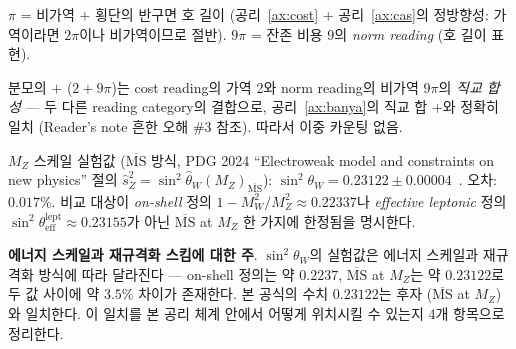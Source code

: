 \documentclass[entropy,article,submit,pdftex,oneauthor]{Definitions/mdpi}
\begin{document}
\textbf{$\pi$} = 비가역 $+$ 횡단의 반구면 호 길이 (공리~\ref{ax:cost} + 공리~\ref{ax:cas}의 정방향성: 가역이라면 $2\pi$이나 비가역이므로 절반). $9\pi$ = 잔존 비용 9의 \emph{norm reading} (호 길이 표현).

분모의 $+$ ($2 + 9\pi$)는 cost reading의 가역 2와 norm reading의 비가역 $9\pi$의 \emph{직교 합성} — 두 다른 reading category의 결합으로, 공리~\ref{ax:banya}의 직교 합 $+$와 정확히 일치 (Reader's note 흔한 오해 \#3 참조). 따라서 이중 카운팅 없음.

$M_Z$ 스케일 실험값 ($\overline{\mathrm{MS}}$ 방식, PDG 2024 ``Electroweak model and constraints on new physics'' 절의 $\hat s_Z^2 = \sin^2\hat\theta_W(M_Z)_{\overline{\mathrm{MS}}}$): $\sin^2\theta_W = 0.23122 \pm 0.00004$~\cite{pdg2024}. 오차: $\mathbf{0.017\%}$. 비교 대상이 \emph{on-shell} 정의 $1 - M_W^2/M_Z^2 \approx 0.22337$나 \emph{effective leptonic} 정의 $\sin^2\theta_{\text{eff}}^{\text{lept}} \approx 0.23155$가 아닌 $\overline{\mathrm{MS}}$ at $M_Z$ 한 가지에 한정됨을 명시한다.

\textbf{에너지 스케일과 재규격화 스킴에 대한 주}.
$\sin^2\theta_W$의 실험값은 에너지 스케일과 재규격화 방식에 따라 달라진다 — on-shell 정의는 약 $0.2237$, $\overline{\mathrm{MS}}$ at $M_Z$는 약 $0.23122$로 두 값 사이에 약 $3.5\%$ 차이가 존재한다. 본 공식의 수치 $0.23122$는 후자 ($\overline{\mathrm{MS}}$ at $M_Z$)와 일치한다. 이 일치를 본 공리 체계 안에서 어떻게 위치시킬 수 있는지 4개 항목으로 정리한다.
\end{document}
